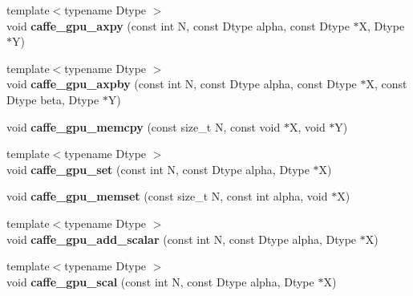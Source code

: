 \begin{DoxyCompactItemize}
\item 
{\footnotesize template$<$typename Dtype $>$ }\\void {\bfseries caffe\+\_\+gpu\+\_\+axpy} (const int N, const Dtype alpha, const Dtype $\ast$X, Dtype $\ast$Y)\hypertarget{namespacecaffe_ac79d56fd4ce846351d09eea5f81f5330}{}\label{namespacecaffe_ac79d56fd4ce846351d09eea5f81f5330}

\item 
{\footnotesize template$<$typename Dtype $>$ }\\void {\bfseries caffe\+\_\+gpu\+\_\+axpby} (const int N, const Dtype alpha, const Dtype $\ast$X, const Dtype beta, Dtype $\ast$Y)\hypertarget{namespacecaffe_a90ff37307cf4b8e665719b30860ebf8e}{}\label{namespacecaffe_a90ff37307cf4b8e665719b30860ebf8e}

\item 
void {\bfseries caffe\+\_\+gpu\+\_\+memcpy} (const size\+\_\+t N, const void $\ast$X, void $\ast$Y)\hypertarget{namespacecaffe_a625b8e199b2b898c7427af4f4606bfa8}{}\label{namespacecaffe_a625b8e199b2b898c7427af4f4606bfa8}

\item 
{\footnotesize template$<$typename Dtype $>$ }\\void {\bfseries caffe\+\_\+gpu\+\_\+set} (const int N, const Dtype alpha, Dtype $\ast$X)\hypertarget{namespacecaffe_af2b443a809594b6af0429ac4cc7a98fd}{}\label{namespacecaffe_af2b443a809594b6af0429ac4cc7a98fd}

\item 
void {\bfseries caffe\+\_\+gpu\+\_\+memset} (const size\+\_\+t N, const int alpha, void $\ast$X)\hypertarget{namespacecaffe_acb4fb4c525b5a45010dfbff016cd375b}{}\label{namespacecaffe_acb4fb4c525b5a45010dfbff016cd375b}

\item 
{\footnotesize template$<$typename Dtype $>$ }\\void {\bfseries caffe\+\_\+gpu\+\_\+add\+\_\+scalar} (const int N, const Dtype alpha, Dtype $\ast$X)\hypertarget{namespacecaffe_aece4dd95b81d7141f740692a5132010f}{}\label{namespacecaffe_aece4dd95b81d7141f740692a5132010f}

\item 
{\footnotesize template$<$typename Dtype $>$ }\\void {\bfseries caffe\+\_\+gpu\+\_\+scal} (const int N, const Dtype alpha, Dtype $\ast$X)\hypertarget{namespacecaffe_a6a43f571b229746dd69e89c6c64301d6}{}\label{namespacecaffe_a6a43f571b229746dd69e89c6c64301d6}


\end{DoxyCompactItemize}
